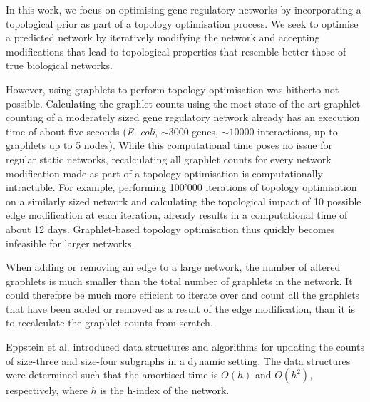 
In this work, we focus on optimising gene regulatory networks by incorporating a topological prior as part of a topology optimisation process. We seek to optimise a predicted network by iteratively modifying the network and accepting modifications that lead to topological properties that resemble better those of true biological networks.

However, using graphlets to perform topology optimisation was hitherto not possible. Calculating the graphlet counts using the most state-of-the-art graphlet counting of a moderately sized gene regulatory network already has an execution time of about five seconds (\textit{E. coli}, $\sim 3000$ genes, $\sim 10000$ interactions, up to graphlets up to 5 nodes).
While this computational time poses no issue for regular static networks, recalculating all graphlet counts for every network modification made as part of a topology optimisation is computationally intractable. For example, performing 100'000 iterations of topology optimisation on a similarly sized network and calculating the topological impact of 10 possible edge modification at each iteration, already results in a computational time of about 12 days. Graphlet-based topology optimisation thus quickly becomes infeasible for larger networks.

When adding or removing an edge to a large network, the number of altered graphlets is much smaller than the total number of graphlets in the network. It could therefore be much more efficient to iterate over and count all the graphlets that have been added or removed as a result of the edge modification, than it is to recalculate the graphlet counts from scratch. 

Eppstein et al. introduced data structures and algorithms for updating the counts of size-three\cite{Eppstein2009} and size-four\cite{Eppstein2012} subgraphs in a dynamic setting. The data structures were determined such that the amortised time is $O(h)$ and $O(h^2)$, respectively, where $h$ is the h-index of the network\cite{Hirsch2005}.

